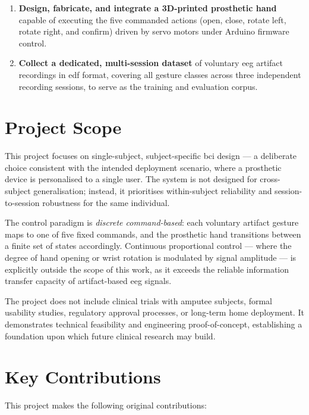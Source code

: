 \begin{enumerate}[leftmargin=*, label=\textbf{O\arabic*.}]
    \item \textbf{Design, fabricate, and integrate a 3D-printed
    prosthetic hand} capable of executing the five commanded actions
    (open, close, rotate left, rotate right, and confirm) driven by
    servo motors under Arduino firmware control.

    \item \textbf{Collect a dedicated, multi-session dataset} of
    voluntary \acrshort{eeg} artifact recordings in \acrshort{edf}
    format, covering all gesture classes across three independent
    recording sessions, to serve as the training and evaluation
    corpus.

\end{enumerate}

\section{Project Scope}
\label{sec:scope}

This project focuses on single-subject, subject-specific
\acrshort{bci} design — a deliberate choice consistent with the
intended deployment scenario, where a prosthetic device is
personalised to a single user. The system is not designed for
cross-subject generalisation; instead, it prioritises within-subject
reliability and session-to-session robustness for the same individual.

The control paradigm is \textit{discrete command-based}: each
voluntary artifact gesture maps to one of five fixed commands, and
the prosthetic hand transitions between a finite set of states
accordingly. Continuous proportional control — where the degree of
hand opening or wrist rotation is modulated by signal amplitude —
is explicitly outside the scope of this work, as it exceeds the
reliable information transfer capacity of artifact-based
\acrshort{eeg} signals.

The project does not include clinical trials with amputee subjects,
formal usability studies, regulatory approval processes, or
long-term home deployment. It demonstrates technical feasibility
and engineering proof-of-concept, establishing a foundation upon
which future clinical research may build.

\section{Key Contributions}
\label{sec:contributions}

This project makes the following original contributions:

